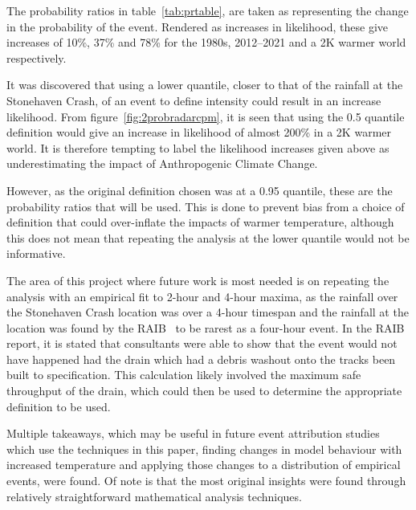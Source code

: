 \documentclass[12pt,a4paper,openany]{report}
\begin{document}

The probability ratios in table~\ref{tab:prtable},
    are taken as representing the change in the probability of the event.
Rendered as increases in likelihood,
    these give increases of 10\%, 37\% and 78\% for the 1980s, 2012--2021 and a 2K warmer world respectively.

It was discovered that using a lower quantile,
    closer to that of the rainfall at the Stonehaven Crash,
    of an event to define intensity could result in an increase likelihood.
From figure~\ref{fig:2probradarcpm},
    it is seen that using the 0.5 quantile definition would give an increase
    in likelihood of almost 200\% in a 2K warmer world.
It is therefore tempting to label the likelihood increases given above as underestimating
    the impact of Anthropogenic Climate Change.

However,
    as the original definition chosen was at a 0.95 quantile,
    these are the probability ratios that will be used.
This is done to prevent bias from a choice of definition that could over-inflate
    the impacts of warmer temperature,
    although this does not mean that repeating the analysis at the lower quantile would not be informative.

The area of this project where future work is most needed is on repeating the analysis
    with an empirical fit to 2-hour and 4-hour maxima,
    as the rainfall over the Stonehaven Crash location was over a 4-hour timespan
    and the rainfall at the location was found by the RAIB~\cite{RAIB_2022}
    to be rarest as a four-hour event.
In the RAIB report,
    it is stated that consultants were able to show that the event would not have happened
    had the drain which had a debris washout onto the tracks been built to specification.
This calculation likely involved the maximum safe throughput of the drain,
    which could then be used to determine the appropriate definition to be used.

Multiple takeaways,
    which may be useful in future event attribution studies
    which use the techniques in this paper,
    finding changes in model behaviour with increased temperature
    and applying those changes to a distribution of empirical events,
    were found.
Of note is that the most original insights were found through relatively straightforward mathematical analysis techniques.
\end{document}
